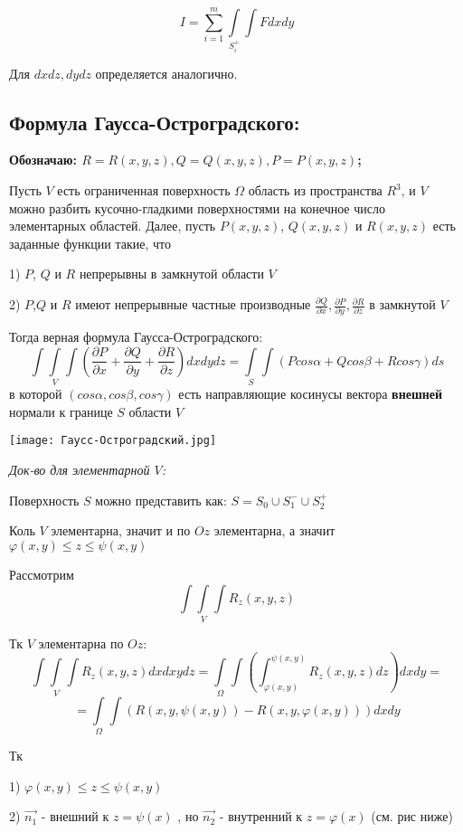 \documentclass[12pt]{article}
\begin{document}
$$
I
=
\sum_{i = 1}^{m} \int\limits_{S_i^+}\int F dxdy 
$$

Для $dxdz , dydz$ определяется аналогично. 


\newpage
\subsection*{Формула Гаусса-Остроградского:}
\textbf{Обозначаю: $R = R(x, y ,z) , Q = Q(x,y,z) , P = P(x,y,z)$;}

		Пусть $V$ есть ограниченная поверхность $\Omega$ область из пространства $R^3$, и $V$ можно разбить кусочно-гладкими поверхностями на конечное число элементарных областей. Далее, пусть $P(x, y ,z)$, $Q(x, y ,z)$ и $R(x,y,z)$ есть заданные функции
такие, что 

1)  $P$, $Q$ и $R$ непрерывны в замкнутой области $V$


2) $P$,$Q$ и $R$ имеют непрерывные частные производные $\frac{\partial Q}{\partial x},\frac{\partial P}{\partial y},
\frac{\partial R}{\partial z} $ в замкнутой $V$

Тогда верная формула Гаусса-Остроградского:
$$
\int\int\limits_{V}\int (\frac{\partial P}{\partial x} + \frac{\partial Q}{\partial y} + \frac{\partial R}{\partial z})dxdydz
=
\int\limits_{S}\int (Pcos\alpha + Qcos\beta + Rcos\gamma)ds
$$
в которой $(cos\alpha, cos\beta, cos\gamma)$ есть направляющие косинусы вектора \textbf{внешней} нормали к границе $S$ области $V$

\texttt{[image: Гаусс-Остроградский.jpg]}

\textit{Док-во для элементарной $V$:}

	Поверхность $S$ можно представить как:
	$S = S_0 \cup S_1^- \cup S_2^+$

	Коль $V$ элементарна, значит и по $Oz$ элементарна, а значит
	$\varphi(x,y) \leq z \leq \psi(x,y)$
	


	Рассмотрим 
	$$\int\int\limits_{V}\int R_z(x,y,z)$$



Тк $V$ элементарна по $Oz$: 
$$
\int\int\limits_{V}\int R_z(x,y,z) dxdxydz
=
\int\limits_{\Omega}\int(\int_{\varphi(x,y)}^{\psi(x,y)} R_z(x,y,z)dz) dxdy
=
$$
$$
=
\int\limits_{\Omega}\int (R(x,y,\psi(x,y)) - R(x,y,\varphi(x,y)))dxdy
$$

Тк 

1)	$\varphi(x,y) \leq z \leq \psi(x,y)$ 

2) $\vec{n_1}$ - внешний к $z = \psi(x)$ , но $\vec{n_2}$ - внутренний к $z = \varphi(x)$ (см. рис ниже)
\end{document}
